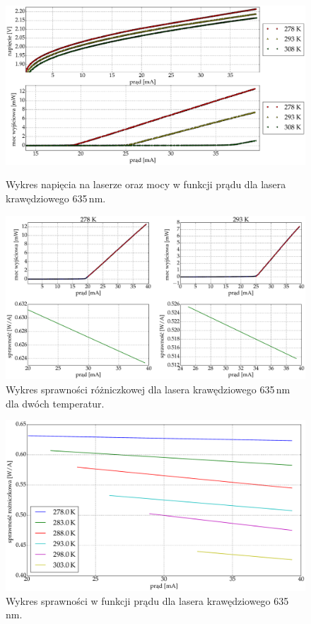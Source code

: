 \begin{figure}
\center
  \includegraphics[scale=0.30]{plot635/plot_voltage_power.eps}
  \label{fig:plot_voltage_power}
  \caption{Wykres napięcia na laserze oraz mocy w funkcji prądu dla lasera krawędziowego 635\,nm.}
\end{figure}
\begin{figure}
\center
  \includegraphics[scale=0.30]{plot635/plot_eff_via_current4.eps}
  \caption{Wykres sprawności różniczkowej dla lasera krawędziowego 635\,nm dla dwóch temperatur.}
  \label{fig:plot_eff_via_current4}
\end{figure}
\begin{figure}
\center
  \includegraphics[scale=0.30]{plot635/plot_eff_via_current_all.eps}
  \caption{Wykres sprawności w funkcji prądu dla lasera krawędziowego 635\,nm.}
  \label{fig:plot_eff_via_current_all}
\end{figure}
\newpage
